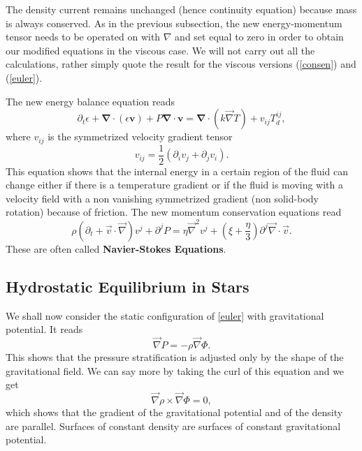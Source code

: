 The density current remains unchanged (hence continuity equation) because mass is always conserved. As in the previous subsection, the new energy-momentum tensor needs to be operated on with $\nabla$ and set equal to zero in order to obtain our modified equations in the viscous case. We will not carry out all the calculations, rather simply quote the result for the viscous versions (\ref{consen}) and (\ref{euler}). 

The new energy balance equation reads
$$
\partial_t \epsilon + \mathbf{\nabla} \cdot (\epsilon \mathbf{v}) + P \mathbf{ \nabla} \cdot \mathbf{v} = \mathbf{\nabla} \cdot (k \vec \nabla T) + v_{ij} T_d^{ij} ,
$$
where $v_{ij}$ is the symmetrized velocity gradient tensor
$$
v_{ij} = \frac{1}{2}(\partial_i v_j + \partial_j v_i).
$$
This equation shows that the internal energy in a certain region of the fluid can change either if there is a temperature gradient or if the fluid is moving with a velocity field with a non vanishing symmetrized gradient (non solid-body rotation) because of friction.
The new momentum conservation equations read
$$
\rho \left( \partial_t + \vec{v} \cdot \vec \nabla \right) v^j+\partial^jP = \eta \vec \nabla^2v^j + \left( \xi + \frac{\eta}{3} \right) \partial^j \vec \nabla \cdot \vec{v}.
$$
These are often called \textbf{Navier-Stokes Equations}.

\subsection{Hydrostatic Equilibrium in Stars}
We shall now consider the static configuration of \ref{euler} with gravitational potential. It reads
\begin{equation} \label{hystat}
	\vec \nabla P = - \rho \vec \nabla \Phi.
\end{equation}
This shows that the pressure stratification is adjusted only by the shape of the gravitational field. We can say more by taking the curl of this equation and we get
$$
\vec \nabla \rho \times  \vec \nabla \Phi =0,
$$
which shows that the gradient of the gravitational potential and of the density are parallel. Surfaces of constant density are surfaces of constant gravitational potential.

